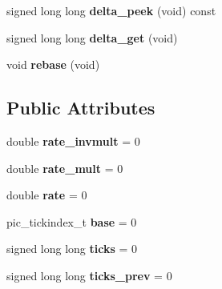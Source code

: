 \begin{DoxyCompactItemize}
\item 
\hypertarget{structVGA__Draw__2_1_1dotclock__t_a3654bad857ec154e0010dbbba18a1bf7}{signed long long {\bfseries delta\-\_\-peek} (void) const }\label{structVGA__Draw__2_1_1dotclock__t_a3654bad857ec154e0010dbbba18a1bf7}

\item 
\hypertarget{structVGA__Draw__2_1_1dotclock__t_af9624be3a4e29cedb9eb82a5ace82942}{signed long long {\bfseries delta\-\_\-get} (void)}\label{structVGA__Draw__2_1_1dotclock__t_af9624be3a4e29cedb9eb82a5ace82942}

\item 
\hypertarget{structVGA__Draw__2_1_1dotclock__t_aaad14b95206787c107559ace17028acc}{void {\bfseries rebase} (void)}\label{structVGA__Draw__2_1_1dotclock__t_aaad14b95206787c107559ace17028acc}

\end{DoxyCompactItemize}
\subsection*{Public Attributes}
\begin{DoxyCompactItemize}
\item 
\hypertarget{structVGA__Draw__2_1_1dotclock__t_aa8ad54482ba1956324ca8fb79158ed6d}{double {\bfseries rate\-\_\-invmult} = 0}\label{structVGA__Draw__2_1_1dotclock__t_aa8ad54482ba1956324ca8fb79158ed6d}

\item 
\hypertarget{structVGA__Draw__2_1_1dotclock__t_a1dadb2e7598d9fab01804c977bd0c43c}{double {\bfseries rate\-\_\-mult} = 0}\label{structVGA__Draw__2_1_1dotclock__t_a1dadb2e7598d9fab01804c977bd0c43c}

\item 
\hypertarget{structVGA__Draw__2_1_1dotclock__t_ae086c689efa3b14d9df81278045787bf}{double {\bfseries rate} = 0}\label{structVGA__Draw__2_1_1dotclock__t_ae086c689efa3b14d9df81278045787bf}

\item 
\hypertarget{structVGA__Draw__2_1_1dotclock__t_a7086d9672082e7e153aa8875bc58eae0}{pic\-\_\-tickindex\-\_\-t {\bfseries base} = 0}\label{structVGA__Draw__2_1_1dotclock__t_a7086d9672082e7e153aa8875bc58eae0}

\item 
\hypertarget{structVGA__Draw__2_1_1dotclock__t_aeaf00e71c420bcbc117491354e8a00ce}{signed long long {\bfseries ticks} = 0}\label{structVGA__Draw__2_1_1dotclock__t_aeaf00e71c420bcbc117491354e8a00ce}

\item 
\hypertarget{structVGA__Draw__2_1_1dotclock__t_ace9041e7fa5dfd2fdc43e0815981611a}{signed long long {\bfseries ticks\-\_\-prev} = 0}\label{structVGA__Draw__2_1_1dotclock__t_ace9041e7fa5dfd2fdc43e0815981611a}

\end{DoxyCompactItemize}


